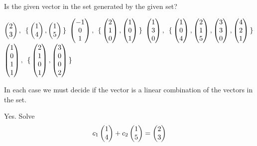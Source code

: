 \begin{exercises}
\begin{answer}
\begin{exparts}
     \end{exparts}  
    \end{answer}
  \recommended \item 
    Is the given vector in the set generated by the
    given set?
      \begin{exparts}
        \partsitem \( \begin{pmatrix} 2 \\ 3 \end{pmatrix}, \)\
          \( \mbox{$\{\,\begin{pmatrix} 1 \\ 4 \end{pmatrix},
                \begin{pmatrix} 1 \\ 5 \end{pmatrix}\,\}$} \)
        \partsitem \( \begin{pmatrix} -1 \\ 0 \\ 1 \end{pmatrix}, \)\
          \( \mbox{$\{\,\begin{pmatrix} 2 \\ 1 \\ 0 \end{pmatrix},
                \begin{pmatrix} 1 \\ 0 \\ 1 \end{pmatrix}\,\}$} \)
        \partsitem \( \begin{pmatrix} 1 \\ 3 \\ 0 \end{pmatrix}, \)\
          \( \mbox{$\{\,\begin{pmatrix} 1 \\ 0 \\ 4 \end{pmatrix},
                \begin{pmatrix} 2 \\ 1 \\ 5 \end{pmatrix},
                \begin{pmatrix} 3 \\ 3 \\ 0 \end{pmatrix},
                \begin{pmatrix} 4 \\ 2 \\ 1 \end{pmatrix}\,\}$} \)
        \partsitem \( \begin{pmatrix} 1 \\ 0 \\ 1 \\ 1 \end{pmatrix}, \)\
          \( \mbox{$\{\,\begin{pmatrix} 2 \\ 1 \\ 0 \\ 1 \end{pmatrix},
                \begin{pmatrix} 3 \\ 0 \\ 0 \\ 2 \end{pmatrix}\,\}$} \)
      \end{exparts}
      \begin{answer}
        In each case we must decide if the vector is a linear combination
        of the vectors in the set.
        \begin{exparts}
          \partsitem Yes.
            Solve
            \begin{equation*}
              c_1\colvec{1 \\ 4}+c_2\colvec{1 \\ 5}=\colvec{2 \\ 3}

\end{equation*}
\end{exparts}
\end{answer}
\end{exercises}
